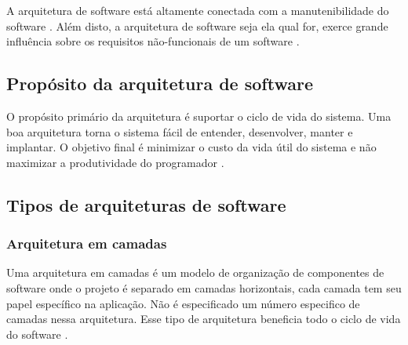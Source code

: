         \par A arquitetura de software está altamente conectada com a manutenibilidade do software \cite{artigo:dantas:2021}. Além disto, a arquitetura de software seja ela qual for, exerce grande influência sobre os requisitos não-funcionais de um software \cite{artigo:lopes:2021}.
    
    \subsection{Propósito da arquitetura de software}
        \par O propósito primário da arquitetura é suportar o ciclo de vida do sistema. Uma boa arquitetura torna o sistema fácil de entender, desenvolver, manter e implantar. O objetivo final é minimizar o custo da vida útil do sistema e não maximizar a produtividade do programador \cite{livro:martin:cleanarch}.


    
    \subsection{Tipos de arquiteturas de software}
        \subsubsection{Arquitetura em camadas}
            \par Uma arquitetura em camadas é um modelo de organização de componentes de software onde o projeto é separado em camadas horizontais, cada camada tem seu papel específico na aplicação. Não é especificado um número especifico de camadas nessa arquitetura. Esse tipo de arquitetura beneficia todo o ciclo de vida do software \cite{artigo:bueno:2021}.
            
        